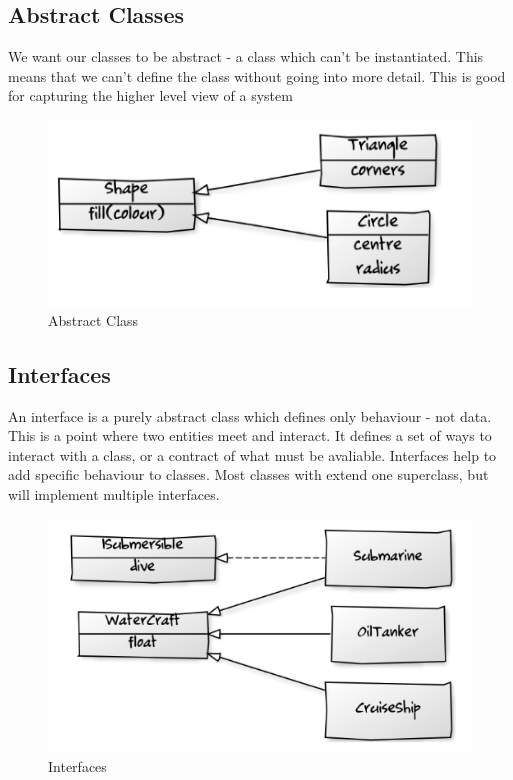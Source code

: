 \documentclass{article}
\begin{document}
\subsection{Abstract Classes}
We want our classes to be abstract - a class which can't be instantiated. This means that we can't define the class without going into more detail. This is good for capturing the higher level view of a system
\begin{figure}[H]
\centering
\includegraphics[width = 0.5\linewidth]{Pictures/Screenshot 2023-01-25 at 13.37.34.png}
\caption{Abstract Class}
\end{figure}
\subsection{Interfaces}\label{interface}
An interface is a purely abstract class which defines only behaviour - not data. This is a point where two entities meet and interact. It defines a set of ways to interact with a class, or a contract of what must be avaliable. Interfaces help to add specific behaviour to classes. Most classes with extend one superclass, but will implement multiple interfaces.
\begin{figure}[H]
\centering
\includegraphics[width = 0.5\linewidth]{Pictures/Screenshot 2023-01-25 at 13.39.41.png}
\caption{Interfaces}
\end{figure}
\pagebreak
\end{document}
